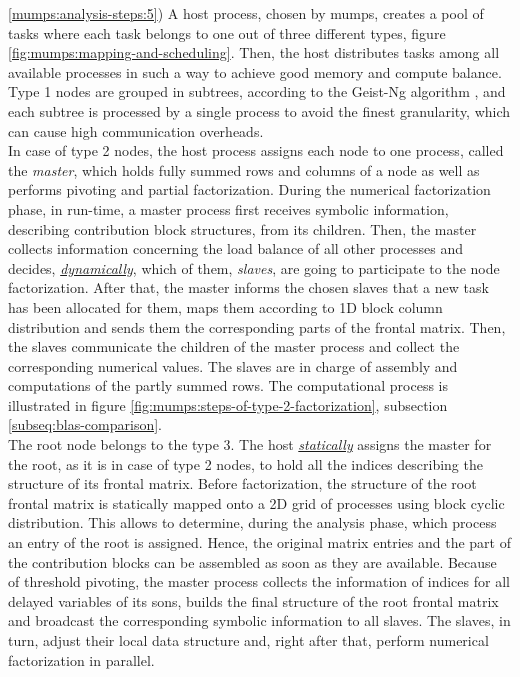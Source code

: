 \ref{mumps:analysis-steps:5}) A host process, chosen by \gls{mumps}, creates a pool of tasks where each task belongs to one out of three different types, figure \ref{fig:mumps:mapping-and-scheduling}. Then, the host distributes tasks among all available processes in such a way to achieve good memory and compute balance.\\

 
Type 1 nodes are grouped in subtrees, according to the Geist-Ng algorithm \cite{geist1989task}, and each subtree is processed by a single process to avoid the finest granularity, which can cause high communication overheads. \\


In case of type 2 nodes, the host process assigns each node to one process, called the \textit{master}, which holds fully summed rows and columns of a node as well as performs pivoting and partial factorization. During the numerical factorization phase, in run-time, a master process first receives symbolic information, describing  contribution block structures, from its children. Then, the master collects information concerning the load balance of all other processes and decides, \underline{\textit{dynamically}},  which of them, \textit{slaves}, are going to participate to the node factorization. After that, the master informs the chosen slaves that a new task has been allocated for them, maps them according to 1D block column distribution and sends them the corresponding parts of the frontal matrix. Then, the slaves communicate the children of the master process and collect the corresponding numerical values. The slaves are in charge of assembly and computations of the partly summed rows. The computational process is illustrated in figure \ref{fig:mumps:steps-of-type-2-factorization}, subsection \ref{subseq:blas-comparison}.\\


The root node belongs to the type 3. The host \underline{\textit{statically}} assigns the master for the root, as it is in case of type 2 nodes, to hold all the indices describing the structure of its frontal matrix. Before factorization, the structure of the root frontal matrix is statically mapped onto a 2D grid of processes using block cyclic distribution. This allows to determine, during the analysis phase, which process an entry of the root is assigned. Hence, the original matrix entries and the part of the contribution blocks can be assembled as soon as they are available. Because of threshold pivoting, the master process collects the information of indices for all delayed variables of its sons, builds the final structure of the root frontal matrix and broadcast the corresponding symbolic information to all slaves. The slaves, in turn, adjust their local data structure and, right after that, perform numerical factorization in parallel.\\


